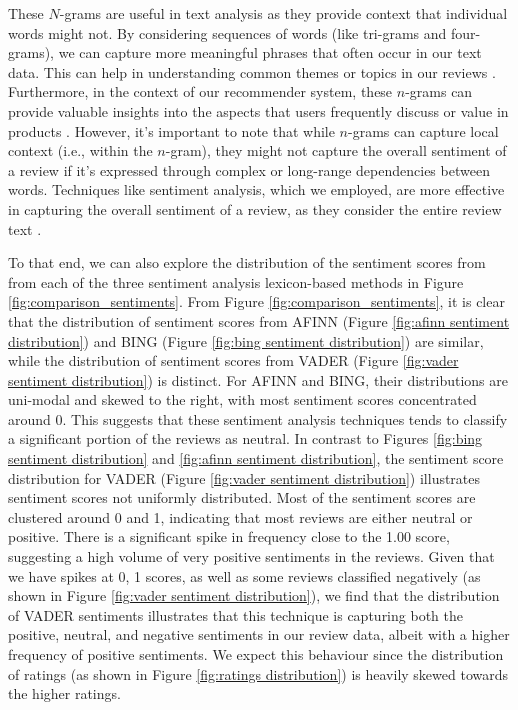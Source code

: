 These $N$-grams are useful in text analysis as they provide context that individual words might not. By considering sequences of words (like tri-grams and four-grams), we can capture more meaningful phrases that often occur in our text data. This can help in understanding common themes or topics in our reviews \cite{collins2019document}. Furthermore, in the context of our recommender system, these $n$-grams can provide valuable insights into the aspects that users frequently discuss or value in products \cite{srifi2020recommender}. However, it’s important to note that while $n$-grams can capture local context (i.e., within the $n$-gram), they might not capture the overall sentiment of a review if it’s expressed through complex or long-range dependencies between words. Techniques like sentiment analysis, which we employed, are more effective in capturing the overall sentiment of a review, as they consider the entire review text \cite{collins2019document}.

To that end, we can also explore the distribution of the sentiment scores from from each of the three sentiment analysis lexicon-based methods in Figure \ref{fig:comparison_sentiments}. From Figure \ref{fig:comparison_sentiments}, it is clear that the distribution of sentiment scores from AFINN (Figure \ref{fig:afinn sentiment distribution}) and BING (Figure \ref{fig:bing sentiment distribution}) are similar, while the distribution of sentiment scores from VADER (Figure \ref{fig:vader sentiment distribution}) is distinct. For AFINN and BING, their distributions are uni-modal and skewed to the right, with most sentiment scores concentrated around 0. This suggests that these sentiment analysis techniques tends to classify a significant portion of the reviews as neutral. In contrast to Figures \ref{fig:bing sentiment distribution} and \ref{fig:afinn sentiment distribution}, the sentiment score distribution for VADER (Figure \ref{fig:vader sentiment distribution}) illustrates sentiment scores not uniformly distributed. Most of the sentiment scores are clustered around 0 and 1, indicating that most reviews are either neutral or positive. There is a significant spike in frequency close to the 1.00 score, suggesting a high volume of very positive sentiments in the reviews. Given that we have spikes at 0, 1 scores, as well as some reviews classified negatively (as shown in Figure \ref{fig:vader sentiment distribution}), we find that the distribution of VADER sentiments illustrates that this technique is capturing both the positive, neutral, and negative sentiments in our review data, albeit with a higher frequency of positive sentiments. We expect this behaviour since the distribution of ratings (as shown in Figure \ref{fig:ratings distribution}) is heavily skewed towards the higher ratings.

